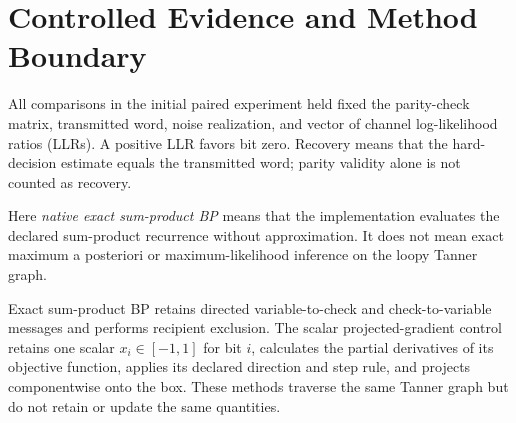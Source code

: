 \documentclass[11pt]{article}
\theoremstyle{remark}
\begin{document}
\section{Controlled Evidence and Method Boundary}

All comparisons in the initial paired experiment held fixed the parity-check
matrix, transmitted word, noise realization, and vector of channel
log-likelihood ratios (LLRs).  A positive LLR favors bit zero.  Recovery means
that the hard-decision estimate equals the transmitted word; parity validity
alone is not counted as recovery.

Here \emph{native exact sum-product BP} means that the implementation evaluates
the declared sum-product recurrence without approximation.  It does not mean
exact maximum a posteriori or maximum-likelihood inference on the loopy Tanner
graph.

Exact sum-product BP retains directed variable-to-check and check-to-variable
messages and performs recipient exclusion.  The scalar projected-gradient
control retains one scalar $x_i\in[-1,1]$ for bit $i$, calculates the partial
derivatives of its objective function, applies its declared direction and step
rule, and projects componentwise onto the box.  These methods traverse the
same Tanner graph but do not retain or update the same quantities.
\end{document}
